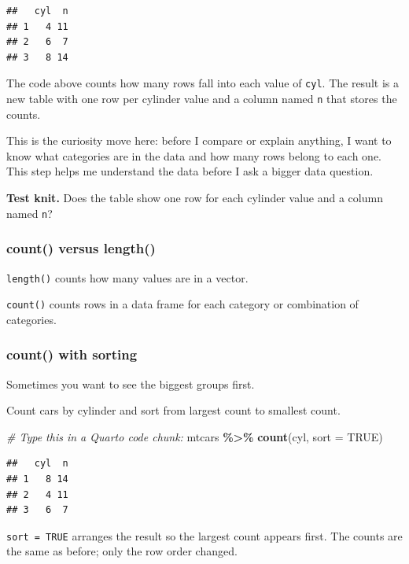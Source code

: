 \documentclass[
]{article}
\newenvironment{Shaded}{\begin{snugshade}}{\end{snugshade}}
\newcommand{\AttributeTok}[1]{\textcolor[rgb]{0.13,0.29,0.53}{#1}}
\newcommand{\CommentTok}[1]{\textcolor[rgb]{0.56,0.35,0.01}{\textit{#1}}}
\newcommand{\ConstantTok}[1]{\textcolor[rgb]{0.56,0.35,0.01}{#1}}
\newcommand{\FunctionTok}[1]{\textcolor[rgb]{0.13,0.29,0.53}{\textbf{#1}}}
\newcommand{\NormalTok}[1]{#1}
\newcommand{\SpecialCharTok}[1]{\textcolor[rgb]{0.81,0.36,0.00}{\textbf{#1}}}
\begin{document}
\begin{verbatim}
##   cyl  n
## 1   4 11
## 2   6  7
## 3   8 14
\end{verbatim}

The code above counts how many rows fall into each value of
\texttt{cyl}. The result is a new table with one row per cylinder value
and a column named \texttt{n} that stores the counts.

This is the curiosity move here: before I compare or explain anything, I
want to know what categories are in the data and how many rows belong to
each one. This step helps me understand the data before I ask a bigger
data question.

\textbf{Test knit.} Does the table show one row for each cylinder value
and a column named \texttt{n}?

\subsubsection{count() versus length()}\label{count-versus-length}

\texttt{length()} counts how many values are in a vector.

\texttt{count()} counts rows in a data frame for each category or
combination of categories.

\subsubsection{count() with sorting}\label{count-with-sorting}

Sometimes you want to see the biggest groups first.

Count cars by cylinder and sort from largest count to smallest count.

\begin{Shaded}
\begin{Highlighting}[]
\CommentTok{\#  Type this in a Quarto code chunk:}
\NormalTok{mtcars }\SpecialCharTok{\%\textgreater{}\%}
  \FunctionTok{count}\NormalTok{(cyl, }\AttributeTok{sort =} \ConstantTok{TRUE}\NormalTok{)}
\end{Highlighting}
\end{Shaded}

\begin{verbatim}
##   cyl  n
## 1   8 14
## 2   4 11
## 3   6  7
\end{verbatim}

\texttt{sort\ =\ TRUE} arranges the result so the largest count appears
first. The counts are the same as before; only the row order changed.
\end{document}
